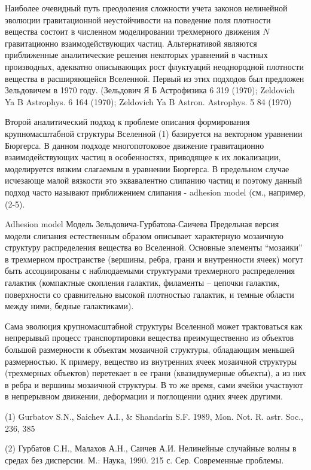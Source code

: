 Наиболее очевидный путь преодоления сложности учета законов нелинейной эволюции гравитационной неустойчивости на поведение поля плотности вещества состоит в численном моделировании трехмерного движения $N$ гравитационно взаимодействующих частиц. Альтернативой являются приближенные аналитические решения некоторых уравнений в частных производных, адекватно описывающих рост флуктуаций неоднородной плотности вещества в расширяющейся Вселенной. Первый из этих подходов был предложен Зельдовичем в 1970 году. (Зельдович Я Б Астрофизика 6 319 (1970); Zeldovich Ya B Astrophys. 6 164 (1970); Zeldovich Ya B Astron. Astrophys. 5 84 (1970)

Второй аналитический подход к проблеме описания формирования крупномасштабной структуры Вселенной (1) базируется на векторном уравнении Бюргерса. В данном подходе многопотоковое движение гравитационно взаимодействующих частиц в особенностях, приводящее к их локализации, моделируется вязким слагаемым в уравнении Бюргерса. В предельном случае исчезающе малой вязкости это эквавалентно слипанию частиц и поэтому данный подход часто называют приближением слипания - adhesion model (см., например, (2-5). 

Adhesion model Модель Зельдовича-Гурбатова-Саичева
Предельная версия модели слипания естественным образом описывает характерную мозаичную структуру распределения вещества во Вселенной. Основные элементы “мозаики” в трехмерном пространстве (вершины, ребра, грани и внутренности ячеек) могут быть ассоциированы с наблюдаемыми структурами трехмерного распределения галактик (компактные скопления галактик, филаменты – цепочки галактик, поверхности со сравнительно высокой плотностью галактик, и темные области между ними, бедные галактиками).

Сама эволюция крупномасштабной структуры Вселенной может трактоваться как непрерывый процесс транспортировки вещества преимущественно из объектов большой размерности к объектам мозаичной структуры, обладающим меньшей размерностью. К примеру, вещество из внутренних ячеек мозаичной структуры (трехмерных объектов) перетекает в ее грани (квазидвумерные объекты), а из них в ребра и вершины мозаичной структуры. В то же время, сами ячейки участвуют в непрерывном движении, деформации и поглощении одних ячеек другими.

(1) Gurbatov S.N., Saichev A.I., \& Shandarin S.F. 1989, Mon. Not. R. astr. Soc., 236, 385

(2) Гурбатов С.Н., Малахов А.Н., Саичев А.И. Нелинейные случайные волны в средах без дисперсии. М.: Наука, 1990. 215 с. Сер. Современные проблемы.


